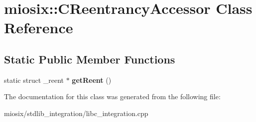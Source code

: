 \hypertarget{classmiosix_1_1_c_reentrancy_accessor}{\section{miosix\-:\-:C\-Reentrancy\-Accessor Class Reference}
\label{classmiosix_1_1_c_reentrancy_accessor}
}
\subsection*{Static Public Member Functions}
\begin{DoxyCompactItemize}
\item 
\hypertarget{classmiosix_1_1_c_reentrancy_accessor_a632b4e83b0e1e9ec1244cbd40ed19b76}{static struct \-\_\-reent $\ast$ {\bfseries get\-Reent} ()}\label{classmiosix_1_1_c_reentrancy_accessor_a632b4e83b0e1e9ec1244cbd40ed19b76}

\end{DoxyCompactItemize}


The documentation for this class was generated from the following file\-:\begin{DoxyCompactItemize}
\item 
miosix/stdlib\-\_\-integration/libc\-\_\-integration.\-cpp\end{DoxyCompactItemize}
